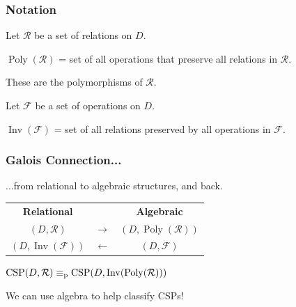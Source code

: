 \documentclass[10pt,xcolor=dvipsnames%
   ]{beamer}
\DeclareMathOperator{\Rel}{Rel}
\newcommand{\bigpause}{\pause\bigskip}
\DeclareMathOperator{\CSP}{CSP}
\DeclareMathOperator{\Poly}{Poly}
\DeclareMathOperator{\Inv}{Inv}
\renewcommand{\.}{\cdot}
\newcommand{\sS}{\ensuremath{\mathcal{S}}}
\newcommand{\sR}{\ensuremath{\mathcal{R}}}
\newcommand{\sF}{\ensuremath{\mathcal{F}}}
\newcommand{\reduc}{\leq_{\text{\textnormal{p}}}}
\newcommand{\equivp}{\equiv_{\text{\textnormal{p}}}}
\let\origtextbf=\textbf
\begin{document}
\begin{frame}
   \frametitle{Notation}

    Let $\sR$ be a set of relations on $D$.

    \bigskip
    \emph{$\Poly(\sR)$}  = set of all operations that preserve
    all relations in $\sR$. 

    \bigskip
    These are the \alert{polymorphisms} of  $\sR$. 

    \bigskip

    Let $\sF$ be a set of operations on $D$. 

    \bigskip
    \emph{$\Inv(\sF)$} = set of all relations preserved by all operations in $\sF$.
  

\end{frame}

\begin{frame}
\frametitle{Galois Connection...}
  ...from relational to algebraic structures, and back.

  \begin{center}
    \begin{tabular}{ccc}
      \origtextbf{Relational} & &\origtextbf{Algebraic}  \\
      $(D,\sR)$ & $\longrightarrow$ & $(D,\Poly(\sR))$ \\[2pt]
      $(D, \Inv(\sF))$ & $\longleftarrow$ &$(D,\sF)$
    \end{tabular}
  \end{center}

  $\CSP(D,\sR) \equivp \CSP(D,\Inv(\Poly(\sR)))$

  We can use algebra to help classify CSPs!

  \end{frame}
\end{document}
